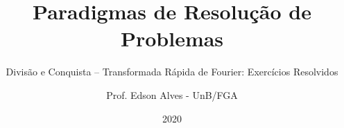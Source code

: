 \title{Paradigmas de Resolução de Problemas}
\subtitle{Divisão e Conquista -- Transformada Rápida de Fourier: Exercícios Resolvidos}
\author{Prof. Edson Alves - UnB/FGA}
\date{2020}
